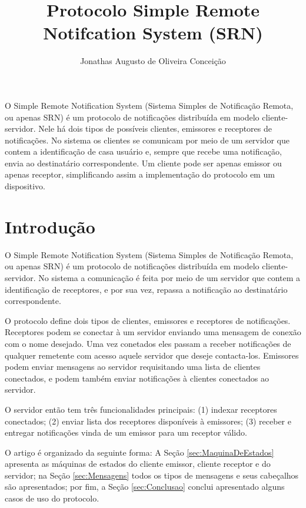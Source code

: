 \documentclass[12pt]{article}
\title{Protocolo Simple Remote Notifcation System (SRN)}
\author{
	Jonathas Augusto de Oliveira Conceição\inst{1}
}
\begin{document}
\maketitle

\begin{resumo}
	O Simple Remote Notification System (Sistema Simples de Notificação Remota, ou apenas SRN)
	é um protocolo de notificações distribuída em modelo cliente-servidor.
	Nele há dois tipos de possíveis clientes, emissores e receptores de notificações.
	No sistema os clientes se comunicam por meio de um servidor que contem a identificação de casa usuário e,
	sempre que recebe uma notificação,
	envia ao destinatário correspondente.
	Um cliente pode ser apenas emissor ou apenas receptor, simplificando assim a implementação do protocolo em um dispositivo.
\end{resumo}

\section{Introdução}

O Simple Remote Notification System (Sistema Simples de Notificação Remota, ou apenas SRN)
é um protocolo de notificações distribuída em modelo cliente-servidor.
No sistema a comunicação é feita por meio de um servidor que contem a identificação de receptores,
e por sua vez, repassa a notificação ao destinatário correspondente.

O protocolo define dois tipos de clientes, emissores e receptores de notificações.
Receptores podem se conectar à um servidor enviando uma mensagem de conexão com o nome desejado.
Uma vez conetados eles passam a receber notificações de qualquer remetente com acesso aquele servidor que deseje contacta-los.
Emissores podem enviar mensagens ao servidor requisitando uma lista de clientes conectados,
e podem também enviar notificações à clientes conectados ao servidor.

O servidor então tem três funcionalidades principais:
(1) indexar receptores conectados;
(2) enviar lista dos receptores disponíveis à emissores;
(3) receber e entregar notificações vinda de um emissor para um receptor válido.

O artigo é organizado da seguinte forma:
A Seção \ref{sec:MaquinaDeEstados} apresenta as máquinas de estados do cliente emissor, cliente receptor e do servidor;
na Seção \ref{sec:Mensagens} todos os tipos de mensagens e seus cabeçalhos são apresentados;
por fim, a Seção \ref{sec:Conclusao} conclui apresentado alguns casos de uso do protocolo.
\end{document}

